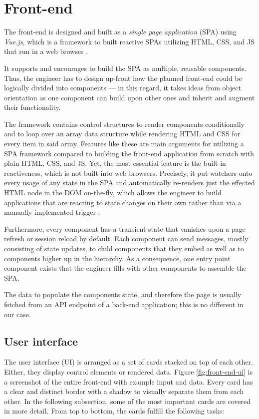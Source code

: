 \documentclass[12pt,a4paper]{report}
\begin{document}
\section{Front-end} \label{sect:implementation-front-end}

The front-end is designed and built as a \textit{single page application} (SPA)
using \textit{Vue.js}, which is a framework to built reactive SPAs utilizing
HTML, CSS, and JS that run in a web browser \cite{vuejs}.

It supports and encourages to build the SPA as multiple, reusable components.
Thus, the engineer has to design up-front how the planned front-end could be
logically divided into components --- in this regard, it takes ideas from
object orientation as one component can build upon other ones and inherit and
augment their functionality.

The framework contains control structures to render components conditionally
and to loop over an array data structure while rendering HTML and CSS for every
item in said array. Features like these are main arguments for utilizing a SPA
framework compared to building the front-end application from scratch with
plain HTML, CSS, and JS. Yet, the most essential feature is the built-in
reactiveness, which is not built into web browsers. Precisely, it put watchers
onto every usage of any state in the SPA and automatically re-renders just the
effected HTML node in the DOM on-the-fly, which allows the engineer to build
applications that are reacting to state changes on their own rather than via a
manually implemented trigger \cite{vuejs}.

Furthermore, every component has a transient state that vanishes upon a page
refresh or session reload by default. Each component can send messages, mostly
consisting of state updates, to child components that they embed as well as to
components higher up in the hierarchy. As a consequence, one entry point
component exists that the engineer fills with other components to assemble the
SPA.

The data to populate the components state, and therefore the page is usually
fetched from an API endpoint of a back-end application; this is no different in
our case.


\subsection{User interface}

The user interface (UI) is arranged as a set of cards stacked on top of each
other. Either, they display control elements or rendered data. Figure \ref{fig:front-end-ui}
is a screenshot of the entire front-end with example input and data.
Every card has a clear and distinct border with a shadow to visually
separate them from each other. In the following subsection, some of the most
important cards are covered in more detail. From top to bottom, the cards
fulfill the following tasks:
\end{document}
